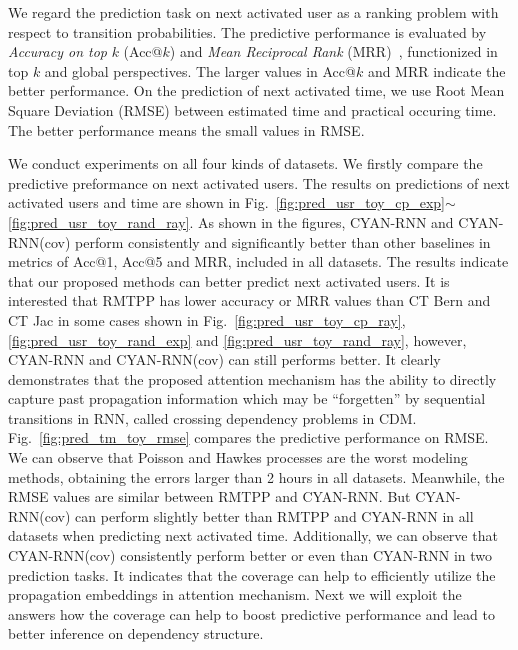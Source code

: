 We regard the prediction task on next activated user as a ranking problem
with respect to transition probabilities. The predictive performance is
evaluated by \textit{Accuracy on top} $k$ (Acc@$k$) and \textit{Mean Reciprocal Rank}
(MRR)~\cite{voorhees1999trec}, functionized in top $k$ and global perspectives.
The larger values in Acc@$k$ and MRR indicate the better performance.
On the prediction of next activated time, we use Root Mean Square Deviation
(RMSE) between estimated time and practical occuring time. The better
performance means the small values in RMSE.   

We conduct experiments on all four
kinds of datasets. We firstly compare the predictive preformance on
next activated users. The results on predictions of next
activated users and time are shown in Fig.~\ref{fig:pred_usr_toy_cp_exp}$\sim$
\ref{fig:pred_usr_toy_rand_ray}. As shown in the figures, CYAN-RNN and CYAN-RNN(cov)
perform consistently and significantly better than other baselines in metrics of
Acc@1, Acc@5 and MRR, included in all datasets. 
The results indicate that our proposed methods can better predict next activated
users. It is interested that RMTPP has lower accuracy or MRR values than CT Bern
and CT Jac in some cases shown in
Fig.~\ref{fig:pred_usr_toy_cp_ray},
\ref{fig:pred_usr_toy_rand_exp} and \ref{fig:pred_usr_toy_rand_ray}, however,
CYAN-RNN and CYAN-RNN(cov) can still performs better. It clearly demonstrates
that the proposed attention mechanism has the ability to directly capture past
propagation information which may be ``forgetten'' by sequential transitions in
RNN, called crossing dependency problems in CDM.
Fig.~\ref{fig:pred_tm_toy_rmse} compares the predictive performance on RMSE.
We can observe that Poisson and Hawkes processes are the worst modeling methods,
obtaining the errors larger than 2 hours in all datasets. Meanwhile, the
RMSE values are similar between RMTPP and CYAN-RNN. But 
CYAN-RNN(cov) can perform slightly better than RMTPP and CYAN-RNN in all
datasets when predicting next activated time. 
Additionally, we can observe that CYAN-RNN(cov) consistently perform better or
even than CYAN-RNN in two prediction tasks. It indicates that the coverage can
help to efficiently utilize the propagation embeddings in attention mechanism.
Next we will exploit the answers how the coverage can help to boost predictive
performance and lead to better inference on dependency structure.

